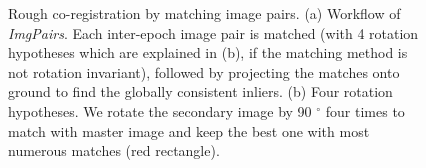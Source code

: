 \begin{figure}[htbp]
    \begin{center}
        \caption{Rough co-registration by matching image pairs. (a) Workflow of \textit{ImgPairs}. Each inter-epoch image pair is matched (with 4 rotation hypotheses which are explained in (b), if the matching method is not rotation invariant), followed by projecting the matches onto ground to find the globally consistent inliers. (b) Four rotation hypotheses. We rotate the secondary image by 90 $^\circ$ four times to match with master image and keep the best one with most numerous matches (red rectangle).}
        \label{WorkflowImgPair}
    \end{center}
\end{figure}

